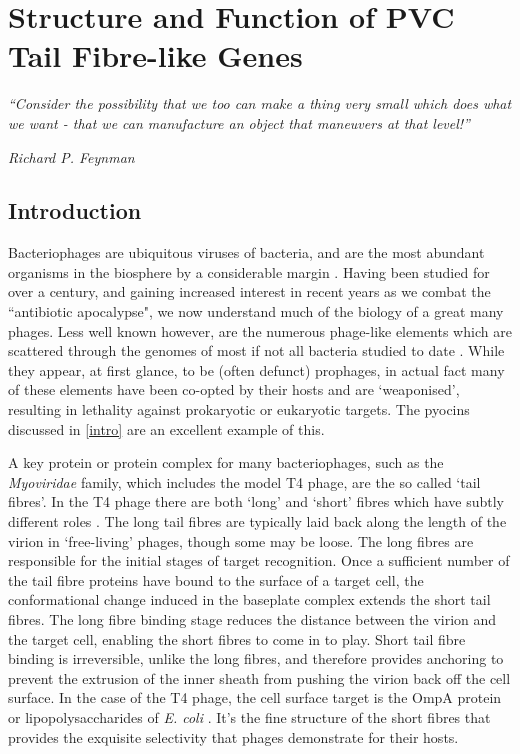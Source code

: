 \chapter{Structure and Function of PVC Tail Fibre-like Genes}\label{tailfibres}
\pagestyle{IHA-fancy-style}

\epigraph{\emph{``Consider the possibility that we too can make a thing very small which does what we want - that we can manufacture an object that maneuvers at that level!''}}{\textit{Richard P. Feynman}}


\section{Introduction}\label{tailfibreintro}
Bacteriophages are ubiquitous viruses of bacteria, and are the most abundant organisms in the biosphere by a considerable margin \citep{Clokie2011, Bartual2010}. Having been studied for over a century, and gaining increased interest in recent years as we combat the ``antibiotic apocalypse", we now understand much of the biology of a great many phages. Less well known however, are the numerous phage-like elements which are scattered through the genomes of most if not all bacteria studied to date \citep{Sarris2014}. While they appear, at first glance, to be (often defunct) prophages, in actual fact many of these elements have been co-opted by their hosts and are `weaponised', resulting in lethality against prokaryotic or eukaryotic targets. The pyocins discussed in \vref{intro} are an excellent example of this.

A key protein or protein complex for many bacteriophages, such as the \emph{Myoviridae} family, which includes the model T4 phage, are the so called `tail fibres'. In the T4 phage there are both `long' and `short' fibres which have subtly different roles \citep{Leiman2010}. The long tail fibres are typically laid back along the length of the virion in `free-living' phages, though some may be loose. The long fibres are responsible for the initial stages of target recognition. Once a sufficient number of the tail fibre proteins have bound to the surface of a target cell, the conformational change induced in the baseplate complex extends the short tail fibres. The long fibre binding stage reduces the distance between the virion and the target cell, enabling the short fibres to come in to play. Short tail fibre binding is irreversible, unlike the long fibres, and therefore provides anchoring to prevent the extrusion of the inner sheath from pushing the virion back off the cell surface. In the case of the T4 phage, the cell surface target is the OmpA protein or lipopolysaccharides of \emph{E. coli} \citep{Granell2014, Taylor2016, Riede1987}. It's the fine structure of the short fibres that provides the exquisite selectivity that phages demonstrate for their hosts.

